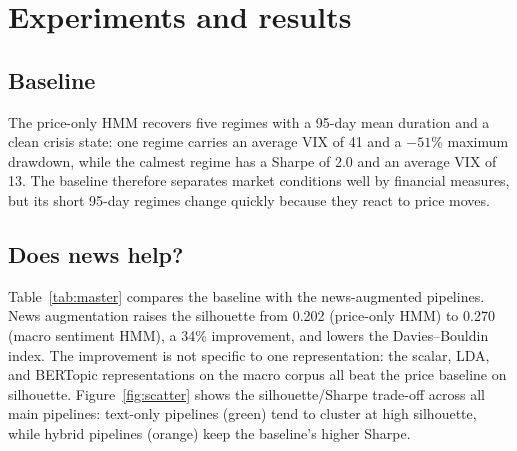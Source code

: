 \documentclass{article} %
\begin{document}
\section{Experiments and results}
\label{sec:results}

\subsection{Baseline}
The price-only HMM recovers five regimes with a 95-day mean duration and a
clean crisis state: one regime carries an average VIX of 41 and a $-51\%$
maximum drawdown, while the calmest regime has a Sharpe of 2.0 and an average
VIX of 13. The baseline therefore separates market conditions well by financial
measures, but its short 95-day regimes change quickly because they react to
price moves.

\subsection{Does news help?}
Table~\ref{tab:master} compares the baseline with the news-augmented pipelines.
News augmentation raises the silhouette from 0.202 (price-only HMM) to 0.270
(macro sentiment HMM), a 34\% improvement, and lowers the Davies--Bouldin index.
The improvement is not specific to one representation: the scalar, LDA, and
BERTopic representations on the macro corpus all beat the price baseline on
silhouette. Figure~\ref{fig:scatter} shows the silhouette/Sharpe trade-off
across all main pipelines: text-only pipelines (green) tend to cluster at high
silhouette, while hybrid pipelines (orange) keep the baseline's higher Sharpe.
\end{document}
